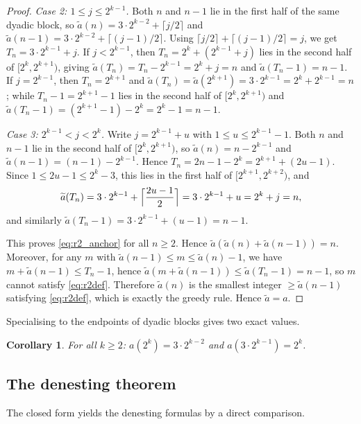 \documentclass[12pt]{article}
\newtheorem{corollary}[theorem]{Corollary}
\theoremstyle{definition}
\theoremstyle{remark}
\begin{document}
\begin{proof}
  \textit{Case 2: $1\le j\le 2^{k-1}$.} Both $n$ and $n-1$ lie in the first half
  of the same dyadic block, so
  $\widetilde a(n)=3\cdot 2^{k-2}+\lceil j/2\rceil$ and
  $\widetilde a(n-1)=3\cdot 2^{k-2}+\lceil(j-1)/2\rceil$.
  Using $\lceil j/2\rceil+\lceil(j-1)/2\rceil=j$, we get $T_n=3\cdot 2^{k-1}+j$.
  If $j<2^{k-1}$, then $T_n=2^k+(2^{k-1}+j)$ lies in the second half of
  $[2^k,2^{k+1})$, giving $\widetilde a(T_n)=T_n-2^{k-1}=2^k+j=n$ and
  $\widetilde a(T_n-1)=n-1$.
  If $j=2^{k-1}$, then $T_n=2^{k+1}$ and
  $\widetilde a(T_n)=\widetilde a(2^{k+1})=3\cdot 2^{k-1}=2^k+2^{k-1}=n$;
  while $T_n-1=2^{k+1}-1$ lies in the second half of $[2^k,2^{k+1})$ and
  $\widetilde a(T_n-1)=(2^{k+1}-1)-2^k=2^k-1=n-1$.

  \textit{Case 3: $2^{k-1}<j<2^k$.} Write $j=2^{k-1}+u$ with $1\le u\le 2^{k-1}-1$.
  Both $n$ and $n-1$ lie in the second half of $[2^k,2^{k+1})$, so
  $\widetilde a(n)=n-2^{k-1}$ and $\widetilde a(n-1)=(n-1)-2^{k-1}$.
  Hence $T_n=2n-1-2^k=2^{k+1}+(2u-1)$.
  Since $1\le 2u-1\le 2^k-3$, this lies in the first half of $[2^{k+1},2^{k+2})$, and
  \[
    \widetilde a(T_n)=3\cdot 2^{k-1}+\Bigl\lceil\frac{2u-1}{2}\Bigr\rceil
    =3\cdot 2^{k-1}+u=2^k+j=n,
  \]
  and similarly $\widetilde a(T_n-1)=3\cdot 2^{k-1}+(u-1)=n-1$.

  This proves \eqref{eq:r2_anchor} for all $n\ge 2$.
  Hence $\widetilde a(\widetilde a(n)+\widetilde a(n-1))=n$.
  Moreover, for any $m$ with $\widetilde a(n-1)\le m\le \widetilde a(n)-1$,
  we have $m+\widetilde a(n-1)\le T_n-1$, hence
  $\widetilde a(m+\widetilde a(n-1))\le \widetilde a(T_n-1)=n-1$,
  so $m$ cannot satisfy \eqref{eq:r2def}.
  Therefore $\widetilde a(n)$ is the smallest integer $\ge \widetilde a(n-1)$
  satisfying \eqref{eq:r2def}, which is exactly the greedy rule.
  Hence $\widetilde a=a$.
\end{proof}

Specialising to the endpoints of dyadic blocks gives two exact values.

\begin{corollary}\label{cor:pivots}
  For all $k\ge 2$: $a(2^k) = 3\cdot 2^{k-2}$ and $a(3\cdot 2^{k-1}) = 2^k$.
\end{corollary}

\subsection{The denesting theorem}

The closed form yields the denesting formulas by a direct comparison.
\end{document}
